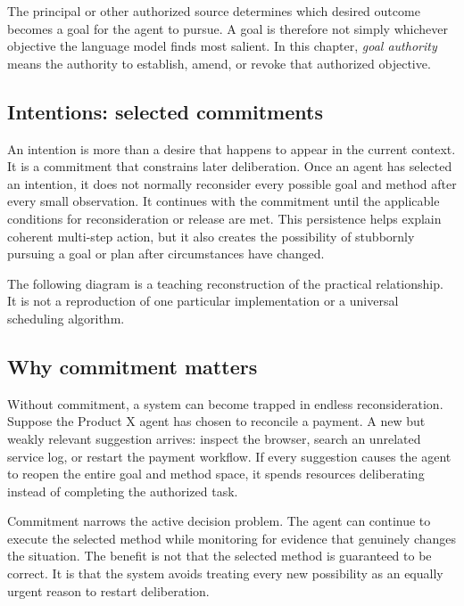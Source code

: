 The principal or other authorized source determines which desired outcome becomes a goal for the agent to pursue. A goal is therefore not simply whichever objective the language model finds most salient. In this chapter, \emph{goal authority} means the authority to establish, amend, or revoke that authorized objective.

\subsection{Intentions: selected commitments}

An \gls{intention} is more than a \gls{desire} that happens to appear in the current context. It is a commitment that constrains later deliberation. Once an agent has selected an intention, it does not normally reconsider every possible goal and method after every small observation. It continues with the commitment until the applicable conditions for reconsideration or release are met. This persistence helps explain coherent multi-step action, but it also creates the possibility of stubbornly pursuing a goal or plan after circumstances have changed.\autocite{rao1991modelingbdi,rao1995bdi}

The following diagram is a teaching reconstruction of the practical relationship. It is not a reproduction of one particular implementation or a universal scheduling algorithm.


\subsection{Why commitment matters}

Without commitment, a system can become trapped in endless reconsideration. Suppose the Product X agent has chosen to reconcile a payment. A new but weakly relevant suggestion arrives: inspect the browser, search an unrelated service log, or restart the payment workflow. If every suggestion causes the agent to reopen the entire goal and method space, it spends resources deliberating instead of completing the authorized task.

Commitment narrows the active decision problem. The agent can continue to execute the selected method while monitoring for evidence that genuinely changes the situation. The benefit is not that the selected method is guaranteed to be correct. It is that the system avoids treating every new possibility as an equally urgent reason to restart deliberation.

